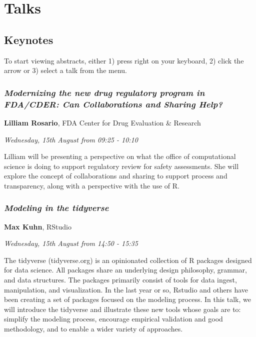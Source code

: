 \documentclass[]{book}
\theoremstyle{definition}
\theoremstyle{definition}
\theoremstyle{definition}
\theoremstyle{remark}
\begin{document}
\hypertarget{part-talks}{%
\part{Talks}\label{part-talks}}

\hypertarget{keynotes}{%
\chapter{Keynotes}\label{keynotes}}

To start viewing abstracts, either 1) press right on your keyboard, 2)
click the arrow or 3) select a talk from the menu.

\hypertarget{modernizing-the-new-drug-regulatory-program-in-fdacder-can-collaborations-and-sharing-help}{%
\section{\texorpdfstring{\emph{Modernizing the new drug regulatory
program in FDA/CDER: Can Collaborations and Sharing
Help?}}{Modernizing the new drug regulatory program in FDA/CDER: Can Collaborations and Sharing Help?}}\label{modernizing-the-new-drug-regulatory-program-in-fdacder-can-collaborations-and-sharing-help}}

\textbf{Lilliam Rosario}, FDA Center for Drug Evaluation \& Research

\emph{Wednesday, 15th August from 09:25 - 10:10}

Lilliam will be presenting a perspective on what the office of
computational science is doing to support regulatory review for safety
assessments. She will explore the concept of collaborations and sharing
to support process and transparency, along with a perspective with the
use of R.

\hypertarget{modeling-in-the-tidyverse}{%
\section{\texorpdfstring{\emph{Modeling in the
tidyverse}}{Modeling in the tidyverse}}\label{modeling-in-the-tidyverse}}

\textbf{Max Kuhn}, RStudio

\emph{Wednesday, 15th August from 14:50 - 15:35}

The tidyverse (tidyverse.org) is an opinionated collection of R packages
designed for data science. All packages share an underlying design
philosophy, grammar, and data structures. The packages primarily consist
of tools for data ingest, manipulation, and visualization. In the last
year or so, Rstudio and others have been creating a set of packages
focused on the modeling process. In this talk, we will introduce the
tidyverse and illustrate these new tools whose goals are to: simplify
the modeling process, encourage empirical validation and good
methodology, and to enable a wider variety of approaches.
\end{document}
